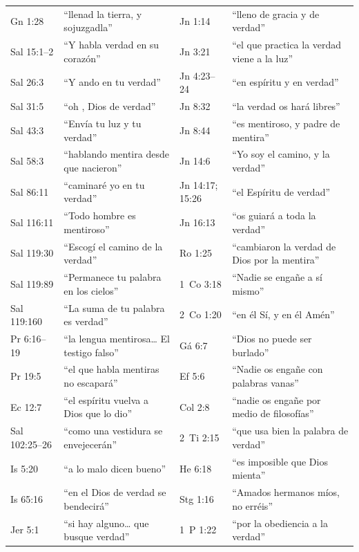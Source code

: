 \begin{center}\small\renewcommand{\arraystretch}{1.12}
\begin{tabular}{@{}L{2.2cm}L{5.0cm}|L{2.2cm}L{5.0cm}@{}}
\toprule
Gn 1:28 & ``llenad la tierra, y sojuzgadla'' & Jn 1:14 & ``lleno de gracia y de verdad'' \\
Sal 15:1--2 & ``Y habla verdad en su corazón'' & Jn 3:21 & ``el que practica la verdad viene a la luz'' \\
Sal 26:3 & ``Y ando en tu verdad'' & Jn 4:23--24 & ``en espíritu y en verdad'' \\
Sal 31:5 & ``oh \SENOR{}, Dios de verdad'' & Jn 8:32 & ``la verdad os hará libres'' \\
Sal 43:3 & ``Envía tu luz y tu verdad'' & Jn 8:44 & ``es mentiroso, y padre de mentira'' \\
Sal 58:3 & ``hablando mentira desde que nacieron'' & Jn 14:6 & ``Yo soy el camino, y la verdad'' \\
Sal 86:11 & ``caminaré yo en tu verdad'' & Jn 14:17; 15:26 & ``el Espíritu de verdad'' \\
Sal 116:11 & ``Todo hombre es mentiroso'' & Jn 16:13 & ``os guiará a toda la verdad'' \\
Sal 119:30 & ``Escogí el camino de la verdad'' & Ro 1:25 & ``cambiaron la verdad de Dios por la mentira'' \\
Sal 119:89 & ``Permanece tu palabra en los cielos'' & 1~Co 3:18 & ``Nadie se engañe a sí mismo'' \\
Sal 119:160 & ``La suma de tu palabra es verdad'' & 2~Co 1:20 & ``en él Sí, y en él Amén'' \\
Pr 6:16--19 & ``la lengua mentirosa\ldots{} El testigo falso'' & Gá 6:7 & ``Dios no puede ser burlado'' \\
Pr 19:5 & ``el que habla mentiras no escapará'' & Ef 5:6 & ``Nadie os engañe con palabras vanas'' \\
Ec 12:7 & ``el espíritu vuelva a Dios que lo dio'' & Col 2:8 & ``nadie os engañe por medio de filosofías'' \\
Sal 102:25--26 & ``como una vestidura se envejecerán'' & 2~Ti 2:15 & ``que usa bien la palabra de verdad'' \\
Is 5:20 & ``a lo malo dicen bueno'' & He 6:18 & ``es imposible que Dios mienta'' \\
Is 65:16 & ``en el Dios de verdad se bendecirá'' & Stg 1:16 & ``Amados hermanos míos, no erréis'' \\
Jer 5:1 & ``si hay alguno\ldots{} que busque verdad'' & 1~P 1:22 & ``por la obediencia a la verdad'' \\

\end{tabular}
\end{center}
